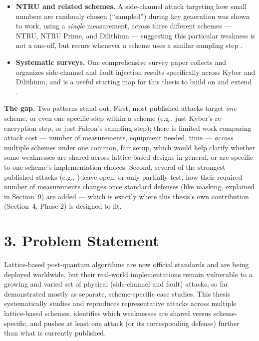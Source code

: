 \documentclass[11pt,a4paper]{article}
\begin{document}
\begin{itemize}[leftmargin=*]
  \item \textbf{NTRU and related schemes.} A side-channel attack targeting how small numbers are randomly chosen (``sampled'') during key generation was shown to work, using a \emph{single} measurement, across three different schemes --- NTRU, NTRU Prime, and Dilithium --- suggesting this particular weakness is not a one-off, but recurs whenever a scheme uses a similar sampling step \cite{karabulut2021singletrace}.
  \item \textbf{Systematic surveys.} One comprehensive survey paper collects and organizes side-channel and fault-injection results specifically across Kyber and Dilithium, and is a useful starting map for this thesis to build on and extend \cite{ravi2024survey}.
\end{itemize}

\textbf{The gap.} Two patterns stand out. First, most published attacks target \emph{one} scheme, or even one specific step within a scheme (e.g., just Kyber's re-encryption step, or just Falcon's sampling step); there is limited work comparing attack cost --- number of measurements, equipment needed, time --- \emph{across} multiple schemes under one common, fair setup, which would help clarify whether some weaknesses are shared across lattice-based designs in general, or are specific to one scheme's implementation choices. Second, several of the strongest published attacks (e.g., \cite{wang2024twostep,singletracefalcon2025}) leave open, or only partially test, how their required number of measurements changes once standard defenses (like masking, explained in Section~9) are added --- which is exactly where this thesis's own contribution (Section~4, Phase 2) is designed to fit.

\section*{3. Problem Statement}

Lattice-based post-quantum algorithms are now official standards and are being deployed worldwide, but their real-world implementations remain vulnerable to a growing and varied set of physical (side-channel and fault) attacks, so far demonstrated mostly as separate, scheme-specific case studies. This thesis systematically studies and reproduces representative attacks across multiple lattice-based schemes, identifies which weaknesses are shared versus scheme-specific, and pushes at least one attack (or its corresponding defense) further than what is currently published.
\end{document}
